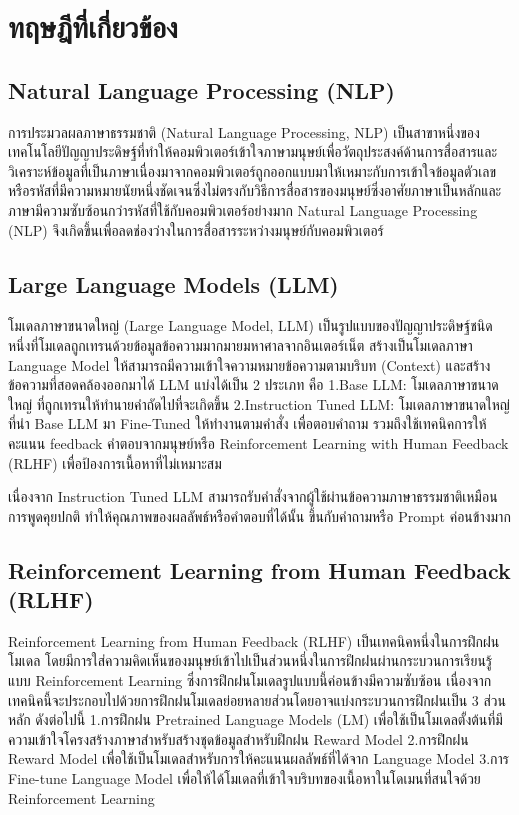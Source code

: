 \documentclass[12pt,oneside,openright,a4paper]{cpe-thai-project}
\begin{document}
\section{ทฤษฎีที่เกี่ยวข้อง}

\subsection{Natural Language Processing (NLP)}
การประมวลผลภาษาธรรมชาติ (Natural Language Processing, NLP) \cite{nlp} เป็นสาขาหนึ่งของเทคโนโลยีปัญญาประดิษฐ์ที่ทำให้คอมพิวเตอร์เข้าใจภาษามนุษย์เพื่อวัตถุประสงค์ด้านการสื่อสารและวิเคราะห์ข้อมูลที่เป็นภาษาเนื่องมาจากคอมพิวเตอร์ถูกออกแบบมาให้เหมาะกับการเข้าใจข้อมูลตัวเลขหรือรหัสที่มีความหมายนัยหนึ่งชัดเจนซึ่งไม่ตรงกับวิธีการสื่อสารของมนุษย์ซึ่งอาศัยภาษาเป็นหลักและภาษามีความซับซ้อนกว่ารหัสที่ใช้กับคอมพิวเตอร์อย่างมาก Natural Language Processing (NLP) จึงเกิดขึ้นเพื่อลดช่องว่างในการสื่อสารระหว่างมนุษย์กับคอมพิวเตอร์
\subsection{Large Language Models (LLM)}
โมเดลภาษาขนาดใหญ่ (Large Language Model, LLM) \cite{llm} เป็นรูปแบบของปัญญาประดิษฐ์ชนิดหนึ่งที่โมเดลถูกเทรนด้วยข้อมูลข้อความมากมายมหาศาลจากอินเตอร์เน็ต สร้างเป็นโมเดลภาษา Language Model ให้สามารถมีความเข้าใจความหมายข้อความตามบริบท (Context) และสร้างข้อความที่สอดคล้องออกมาได้ LLM แบ่งได้เป็น 2 ประเภท คือ 1.Base LLM: โมเดลภาษาขนาดใหญ่ ที่ถูกเทรนให้ทำนายคำถัดไปที่จะเกิดขึ้น 2.Instruction Tuned LLM: โมเดลภาษาขนาดใหญ่ที่นำ Base LLM มา Fine-Tuned ให้ทำงานตามคำสั่ง เพื่อตอบคำถาม รวมถึงใช้เทคนิคการให้คะแนน feedback คำตอบจากมนุษย์หรือ Reinforcement Learning with Human Feedback (RLHF) เพื่อป้องการเนื้อหาที่ไม่เหมาะสม

เนื่องจาก Instruction Tuned LLM สามารถรับคำสั่งจากผู้ใช้ผ่านข้อความภาษาธรรมชาติเหมือนการพูดคุยปกติ ทำให้คุณภาพของผลลัพธ์หรือคำตอบที่ได้นั้น ขึ้นกับคำถามหรือ Prompt ค่อนข้างมาก
\subsection{Reinforcement Learning from Human Feedback (RLHF)}
Reinforcement Learning from Human Feedback (RLHF) \cite{rlhf} เป็นเทคนิคหนึ่งในการฝึกฝนโมเดล โดยมีการใส่ความคิดเห็นของมนุษย์เข้าไปเป็นส่วนหนึ่งในการฝึกฝนผ่านกระบวนการเรียนรู้แบบ Reinforcement Learning ซึ่งการฝึกฝนโมเดลรูปแบบนี้ค่อนข้างมีความซับซ้อน เนื่องจากเทคนิคนี้จะประกอบไปด้วยการฝึกฝนโมเดลย่อยหลายส่วนโดยอาจแบ่งกระบวนการฝึกฝนเป็น 3 ส่วนหลัก ดังต่อไปนี้
1.การฝึกฝน Pretrained Language Models (LM) เพื่อใช้เป็นโมเดลตั้งต้นที่มีความเข้าใจโครงสร้างภาษาสำหรับสร้างชุดข้อมูลสำหรับฝึกฝน Reward Model
2.การฝึกฝน Reward Model เพื่อใช้เป็นโมเดลสำหรับการให้คะแนนผลลัพธ์ที่ได้จาก Language Model
3.การ Fine-tune Language Model เพื่อให้ได้โมเดลที่เข้าใจบริบทของเนื้อหาในโดเมนที่สนใจด้วย Reinforcement Learning
\end{document}
